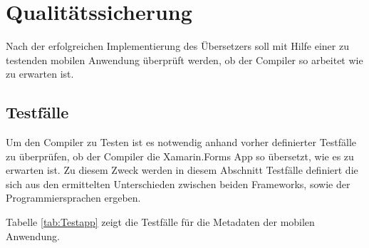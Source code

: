 \chapter{Qualitätssicherung}
\label{chap:Qualitätssicherung}

Nach der erfolgreichen Implementierung des Übersetzers soll mit Hilfe einer zu testenden mobilen Anwendung überprüft werden,  ob der Compiler so arbeitet wie zu erwarten ist.  
\section{Testfälle}
Um den Compiler zu Testen ist es notwendig anhand vorher definierter Testfälle zu überprüfen, ob der Compiler die Xamarin.Forms App so übersetzt, wie es zu erwarten ist.   Zu diesem Zweck werden in diesem Abschnitt Testfälle definiert die sich aus den ermittelten Unterschieden zwischen beiden Frameworks,  sowie der Programmiersprachen ergeben. 

Tabelle \ref{tab:Testapp} zeigt die Testfälle für die Metadaten der mobilen Anwendung. 

